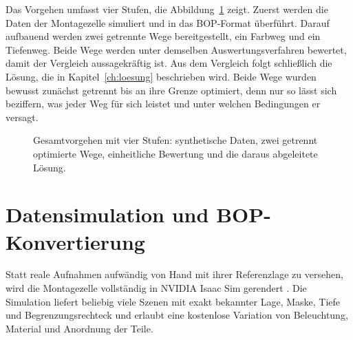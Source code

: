 \documentclass[oneside,studentpaper]{wbk}
\begin{document}
Das Vorgehen umfasst vier Stufen, die Abbildung~\ref{fig:overview} zeigt. Zuerst
werden die Daten der Montagezelle simuliert und in das BOP-Format überführt.
Darauf aufbauend werden zwei getrennte Wege bereitgestellt, ein Farbweg und ein
Tiefenweg. Beide Wege werden unter demselben Auswertungsverfahren bewertet, damit
der Vergleich aussagekräftig ist. Aus dem Vergleich folgt schließlich die
Lösung, die in Kapitel~\ref{ch:loesung} beschrieben wird. Beide Wege wurden
bewusst zunächst getrennt bis an ihre Grenze optimiert, denn nur so lässt sich
beziffern, was jeder Weg für sich leistet und unter welchen Bedingungen er
versagt.

\begin{figure}[H]
\centering
{}
\caption{Gesamtvorgehen mit vier Stufen: synthetische Daten, zwei getrennt
optimierte Wege, einheitliche Bewertung und die daraus abgeleitete Lösung.}
\label{fig:overview}
\end{figure}

\section{Datensimulation und BOP-Konvertierung}
\label{sec:datasim}

Statt reale Aufnahmen aufwändig von Hand mit ihrer Referenzlage zu versehen, wird
die Montagezelle vollständig in NVIDIA Isaac Sim gerendert \cite{isaacsim}. Die
Simulation liefert beliebig viele Szenen mit exakt bekannter Lage, Maske, Tiefe
und Begrenzungsrechteck und erlaubt eine kostenlose Variation von Beleuchtung,
Material und Anordnung der Teile.
\end{document}
